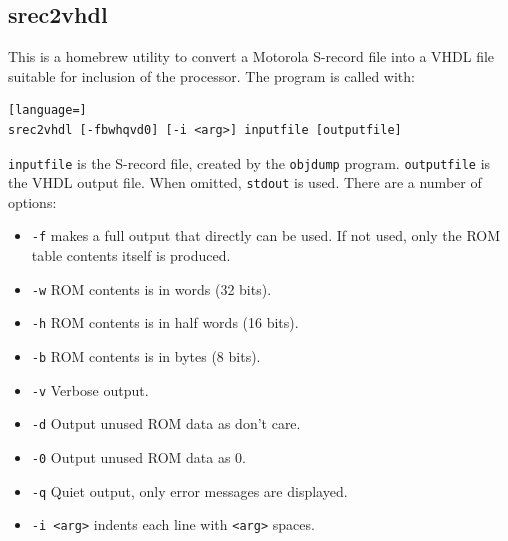 \documentclass[12pt]{article}
\begin{document}
\subsection{srec2vhdl}
This is a homebrew utility to convert a Motorola S-record file into a VHDL file suitable for inclusion of the processor. The program is called with:

\begin{lstlisting}[language=]
srec2vhdl [-fbwhqvd0] [-i <arg>] inputfile [outputfile]
\end{lstlisting}

\lstinline|inputfile| is the S-record file, created by the \lstinline|objdump| program. \lstinline|outputfile| is the VHDL output file. When omitted, \lstinline|stdout| is used. There are a number of options:

\begin{itemize}
\item \lstinline|-f| makes a full output that directly can be used. If not used, only the ROM table contents itself is produced.
\item \lstinline|-w| ROM contents is in words (32 bits).
\item \lstinline|-h| ROM contents is in half words (16 bits).
\item \lstinline|-b| ROM contents is in bytes (8 bits).
\item \lstinline|-v| Verbose output.
\item \lstinline|-d| Output unused ROM data as don't care.
\item \lstinline|-0| Output unused ROM data as 0.
\item \lstinline|-q| Quiet output, only error messages are displayed.
\item \lstinline|-i <arg>| indents each line with \lstinline|<arg>| spaces.
\end{itemize}
\end{document}
